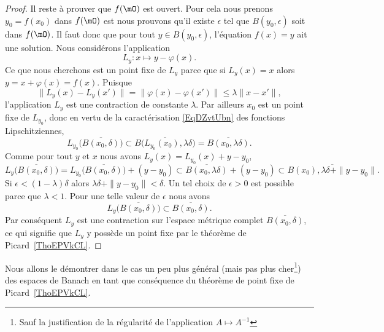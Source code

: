 \begin{proof}
	Il reste à prouver que \( f(\mO)\) est ouvert. Pour cela nous prenons \( y_0=f(x_0)\) dans \( f(\mO)\) est nous prouvons qu'il existe \( \epsilon\) tel que \( B(y_0,\epsilon)\) soit dans \( f(\mO)\). Il faut donc que pour tout \( y\in B(y_0,\epsilon)\), l'équation \( f(x)=y\) ait une solution. Nous considérons l'application
	\begin{equation}
		L_y\colon x\mapsto y-\varphi(x).
	\end{equation}
	Ce que nous cherchons est un point fixe de \( L_y\) parce que si \( L_y(x)=x\) alors \( y=x+\varphi(x)=f(x)\). Puisque
	\begin{equation}
		\big\| L_y(x)-L_y(x') \big\|=\big\| \varphi(x)-\varphi(x') \big\|\leq\lambda\| x-x' \|,
	\end{equation}
	l'application \( L_y\) est une contraction de constante \( \lambda\). Par ailleurs \( x_0\) est un point fixe de \( L_{y_0}\), donc en vertu de la caractérisation \eqref{EqDZvtUbn} des fonctions Lipschitziennes,
	\begin{equation}
		L_{y_0}\big( \overline{ B(x_0,\delta) } \big)\subset \overline{ B\big( L_{y_0}(x_0),\lambda\delta \big) }=\overline{ B(x_0,\lambda\delta) }.
	\end{equation}
	Comme pour tout \( y\) et \( x\) nous avons \( L_y(x)=L_{y_0}(x)+y-y_0\),
	\begin{equation}
		L_y\big( \overline{ B(x_0,\delta) } \big)=L_{y_0}\big( \overline{ B(x_0,\delta) } \big)+(y-y_0)\subset \overline{ B(x_0,\lambda\delta) }+(y-y_0)\subset \overline{ B(x_0),\lambda\delta+\| y-y_0 \| }.
	\end{equation}
	Si \( \epsilon<(1-\lambda)\delta\) alors \( \lambda\delta+\| y-y_0 \|<\delta\). Un tel choix de \( \epsilon>0\) est possible parce que \( \lambda<1\). Pour une telle valeur de \( \epsilon\) nous avons
	\begin{equation}
		L_y\big( \overline{ B(x_0,\delta) } \big)\subset \overline{ B(x_0,\delta) }.
	\end{equation}
	Par conséquent \( L_y\) est une contraction sur l'espace métrique complet \( \overline{ B(x_0,\delta) }\), ce qui signifie que \( L_y\) y possède un point fixe par le théorème de Picard~\ref{ThoEPVkCL}.
\end{proof}

Nous allons le démontrer dans le cas un peu plus général (mais pas plus cher\footnote{Sauf la justification de la régularité de l'application \( A\mapsto A^{-1}\)}) des espaces de Banach en tant que conséquence du théorème de point fixe de Picard~\ref{ThoEPVkCL}.

